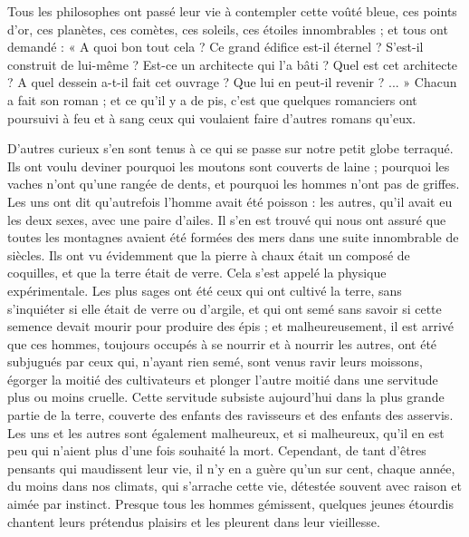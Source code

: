 \documentclass[a4paper, 11pt, oneside]{article}
\begin{document}
Tous les philosophes ont passé leur vie à contempler cette voûté bleue, ces points d'or, ces planètes, ces comètes, ces soleils, ces étoiles innombrables ; et tous ont demandé : « A quoi bon tout cela ? Ce grand édifice est-il éternel ? S'est-il construit de lui-même ? Est-ce un architecte qui l'a bâti ? Quel est cet architecte ? A quel dessein a-t-il fait cet ouvrage ? Que lui en peut-il revenir ? ... » Chacun a fait son roman ; et ce qu'il y a de pis, c'est que quelques romanciers ont poursuivi à feu et à sang ceux qui voulaient faire d'autres romans qu'eux.

D'autres curieux s'en sont tenus à ce qui se passe sur notre petit globe terraqué. Ils ont voulu deviner pourquoi les moutons sont couverts de laine ; pourquoi les vaches n'ont qu'une rangée de dents, et pourquoi les hommes n'ont pas de griffes. Les uns ont dit qu'autrefois l'homme avait été poisson : les autres, qu'il avait eu les deux sexes, avec une paire d'ailes. Il s'en est trouvé qui nous ont assuré que toutes les montagnes avaient été formées des mers dans une suite innombrable de siècles. Ils ont vu évidemment que la pierre à chaux était un composé de coquilles, et que la terre était de verre. Cela s'est appelé la physique expérimentale. Les plus sages ont été ceux qui ont cultivé la terre, sans s'inquiéter si elle était de verre ou d'argile, et qui ont semé sans savoir si cette semence devait mourir pour produire des épis ; et malheureusement, il est arrivé que ces hommes, toujours occupés à se nourrir et à nourrir les autres, ont été subjugués par ceux qui, n'ayant rien semé, sont venus ravir leurs moissons, égorger la moitié des cultivateurs et plonger l'autre moitié dans une servitude plus ou moins cruelle. Cette servitude subsiste aujourd'hui dans la plus grande partie de la terre, couverte des enfants des ravisseurs et des enfants des asservis. Les uns et les autres sont également malheureux, et si malheureux, qu'il en est peu qui n'aient plus d'une fois souhaité la mort. Cependant, de tant d'êtres pensants qui maudissent leur vie, il n'y en a guère qu'un sur cent, chaque année, du moins dans nos climats, qui s'arrache cette vie, détestée souvent avec raison et aimée par instinct. Presque tous les hommes gémissent, quelques jeunes étourdis chantent leurs prétendus plaisirs et les pleurent dans leur vieillesse.
\end{document}
